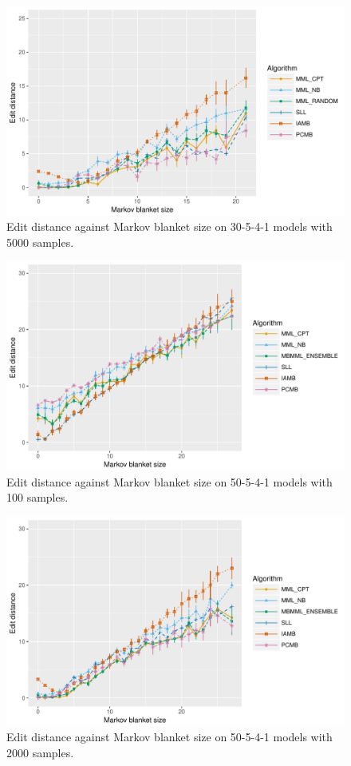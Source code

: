 \begin{figure}[H]
  \centering
    \includegraphics[scale=0.6]{figures/ed_vs_mbsize_30_5_4_1_5000.pdf}
  \caption{Edit distance against Markov blanket size on 30-5-4-1 models with 5000 samples.}
\end{figure} 

\begin{figure}[H]
  \centering
    \includegraphics[scale=0.6]{figures/ed_vs_mbsize_50_5_4_1_100.pdf}
  \caption{Edit distance against Markov blanket size on 50-5-4-1 models with 100 samples.}
\end{figure} 

\begin{figure}[H]
  \centering
    \includegraphics[scale=0.6]{figures/ed_vs_mbsize_50_5_4_1_2000.pdf}
  \caption{Edit distance against Markov blanket size on 50-5-4-1 models with 2000 samples.}
\end{figure} 

